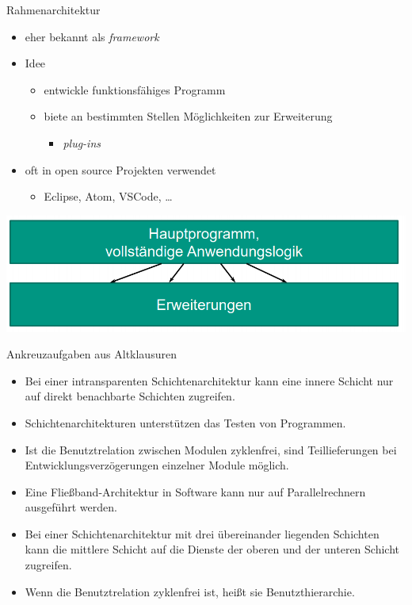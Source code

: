 \documentclass[18pt]{beamer}
\newcommand{\cmark}{\ding{51}}%
\newcommand{\xmark}{\ding{55}}%
\newcommand{\correct}{\textcolor{green}{\cmark}}
\newcommand{\ncorrect}{\textcolor{red}{\xmark}}
\begin{document}
\begin{frame}{Rahmenarchitektur}
	\begin{itemize}
		\item eher bekannt als \emph{framework}
		\item Idee 
		\begin{itemize}
			\item entwickle funktionsfähiges Programm
			\item biete an bestimmten Stellen Möglichkeiten zur Erweiterung
			\begin{itemize}
				\item \emph{plug-ins}
			\end{itemize}
		\end{itemize}
		\item oft in open source Projekten verwendet
		\begin{itemize}
			\item Eclipse, Atom, VSCode, \dots
		\end{itemize}
	\end{itemize}
	\centering \includegraphics[scale=0.4]{pics/tut3/framework.png}
\end{frame}

\begin{frame}{Ankreuzaufgaben aus Altklausuren}
	\begin{itemize}
		\item Bei einer intransparenten Schichtenarchitektur kann eine innere Schicht nur auf direkt benachbarte Schichten zugreifen. \pause \ncorrect
		\item Schichtenarchitekturen unterstützen das Testen von Programmen. \pause \correct
		\item Ist die Benutztrelation zwischen Modulen zyklenfrei, sind Teillieferungen bei Entwicklungsverzögerungen einzelner Module möglich. \pause \correct
		\item Eine Fließband-Architektur in Software kann nur auf Parallelrechnern ausgeführt werden. \pause \ncorrect
		\item Bei einer Schichtenarchitektur mit drei übereinander liegenden Schichten kann die mittlere Schicht auf die Dienste der oberen und der unteren Schicht zugreifen. \pause \ncorrect
		\item Wenn die Benutztrelation zyklenfrei ist, heißt sie Benutzthierarchie. \pause \correct
	\end{itemize}
\end{frame}
\end{document}
